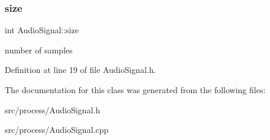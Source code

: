 \mbox{\label{class_audio_signal_a44e595328705720f380613f1675dbdd1}} 
\subsubsection{\texorpdfstring{size}{size}}
{\footnotesize\ttfamily int Audio\+Signal\+::size}

number of samples 

Definition at line 19 of file Audio\+Signal.\+h.



The documentation for this class was generated from the following files\+:\begin{DoxyCompactItemize}
\item 
src/process/Audio\+Signal.\+h\item 
src/process/Audio\+Signal.\+cpp\end{DoxyCompactItemize}
